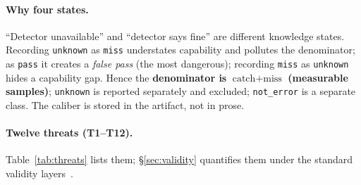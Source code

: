 \documentclass{article}
\begin{document}
\paragraph{Why four states.} ``Detector unavailable'' and ``detector says fine'' are different
knowledge states. Recording \texttt{unknown} as \texttt{miss} understates capability and pollutes
the denominator; as \texttt{pass} it creates a \emph{false pass} (the most dangerous); recording
\texttt{miss} as \texttt{unknown} hides a capability gap. Hence the \textbf{denominator is
$\text{catch}+\text{miss}$ (measurable samples)}; \texttt{unknown} is reported separately and
excluded; \texttt{not\_error} is a separate class. The caliber is stored in the artifact, not in
prose.

\paragraph{Twelve threats (T1--T12).}
Table~\ref{tab:threats} lists them; \S\ref{sec:validity} quantifies them under the standard
validity layers~\cite{shadish2002experimental}.
\end{document}
